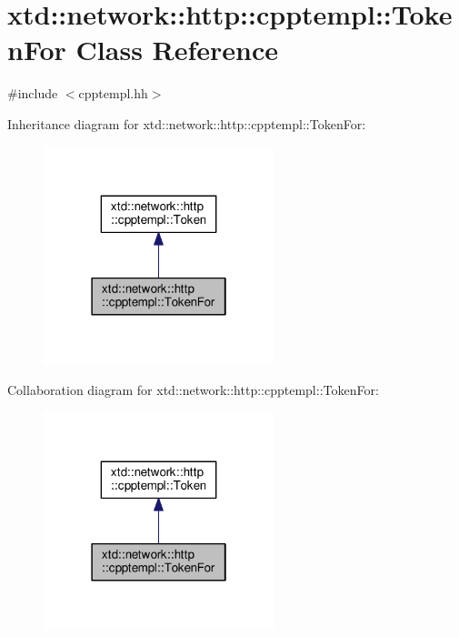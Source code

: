 \hypertarget{classxtd_1_1network_1_1http_1_1cpptempl_1_1TokenFor}{\section{xtd\-:\-:network\-:\-:http\-:\-:cpptempl\-:\-:Token\-For Class Reference}
\label{classxtd_1_1network_1_1http_1_1cpptempl_1_1TokenFor}
}


{\ttfamily \#include $<$cpptempl.\-hh$>$}



Inheritance diagram for xtd\-:\-:network\-:\-:http\-:\-:cpptempl\-:\-:Token\-For\-:
\nopagebreak
\begin{figure}[H]
\begin{center}
\leavevmode
\includegraphics[width=190pt]{classxtd_1_1network_1_1http_1_1cpptempl_1_1TokenFor__inherit__graph}
\end{center}
\end{figure}


Collaboration diagram for xtd\-:\-:network\-:\-:http\-:\-:cpptempl\-:\-:Token\-For\-:
\nopagebreak
\begin{figure}[H]
\begin{center}
\leavevmode
\includegraphics[width=190pt]{classxtd_1_1network_1_1http_1_1cpptempl_1_1TokenFor__coll__graph}
\end{center}
\end{figure}
